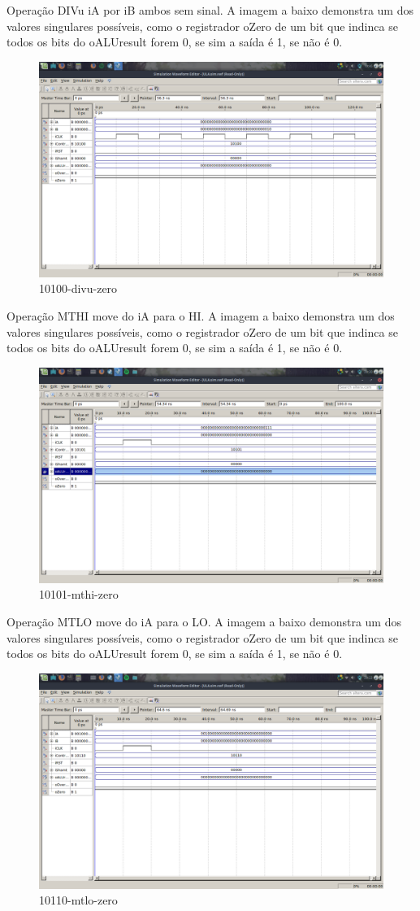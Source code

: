 \documentclass[12pt]{article}
\begin{document}
Operação DIVu iA por iB ambos sem sinal.
A imagem a baixo demonstra um dos valores singulares possíveis, como o registrador oZero de um bit que indinca se todos os bits do oALUresult forem 0, se sim a saída é 1, se não é 0.
\begin{figure}[H]
	\centering
	\includegraphics[width=.8\textwidth]{10100-divu-zero.png}
	\caption{10100-divu-zero}
	\label{fig:10100-divu-zero}
\end{figure}
Operação MTHI move do iA para o HI.
A imagem a baixo demonstra um dos valores singulares possíveis, como o registrador oZero de um bit que indinca se todos os bits do oALUresult forem 0, se sim a saída é 1, se não é 0.
\begin{figure}[H]
	\centering
	\includegraphics[width=.8\textwidth]{10101-mthi-zero.png}
	\caption{10101-mthi-zero}
	\label{fig:10101-mthi-zero}
\end{figure}
Operação MTLO move do iA para o LO.
A imagem a baixo demonstra um dos valores singulares possíveis, como o registrador oZero de um bit que indinca se todos os bits do oALUresult forem 0, se sim a saída é 1, se não é 0.
\begin{figure}[H]
	\centering
	\includegraphics[width=.8\textwidth]{10110-mtlo-zero.png}
	\caption{10110-mtlo-zero}
	\label{fig:10110-mtlo-zero}
\end{figure}
\end{document}
